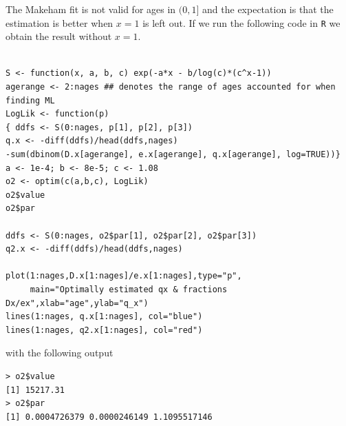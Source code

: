 The Makeham fit is not valid for ages in $(0,1]$ and the expectation is that the estimation is better when $x=1$ is left out. If we run the following code in \verb|R| we obtain the result without $x=1$.
\begin{verbatim}

S <- function(x, a, b, c) exp(-a*x - b/log(c)*(c^x-1))
agerange <- 2:nages ## denotes the range of ages accounted for when finding ML
LogLik <- function(p)
{ ddfs <- S(0:nages, p[1], p[2], p[3])
q.x <- -diff(ddfs)/head(ddfs,nages)
-sum(dbinom(D.x[agerange], e.x[agerange], q.x[agerange], log=TRUE))}
a <- 1e-4; b <- 8e-5; c <- 1.08
o2 <- optim(c(a,b,c), LogLik) 
o2$value
o2$par

ddfs <- S(0:nages, o2$par[1], o2$par[2], o2$par[3])
q2.x <- -diff(ddfs)/head(ddfs,nages)

plot(1:nages,D.x[1:nages]/e.x[1:nages],type="p",
     main="Optimally estimated qx & fractions Dx/ex",xlab="age",ylab="q_x")
lines(1:nages, q.x[1:nages], col="blue")
lines(1:nages, q2.x[1:nages], col="red")

\end{verbatim}

with the following output

\begin{verbatim}
> o2$value
[1] 15217.31
> o2$par
[1] 0.0004726379 0.0000246149 1.1095517146
\end{verbatim}




